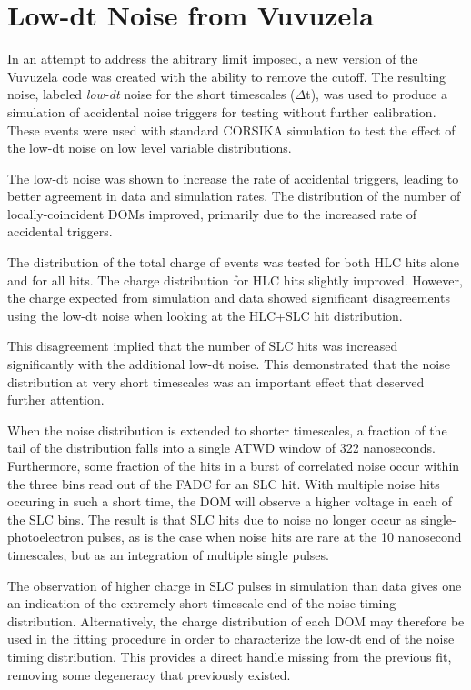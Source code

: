\label{sec:lowdt_vuvuzela}
\section{Low-dt Noise from Vuvuzela}
In an attempt to address the abitrary limit imposed, a new version of the Vuvuzela code was created with the ability to remove the cutoff.
The resulting noise, labeled \emph{low-dt} noise for the short timescales ($\Delta$t), was used to produce a simulation of accidental noise triggers for testing without further calibration.
These events were used with standard CORSIKA simulation to test the effect of the low-dt noise on low level variable distributions.

The low-dt noise was shown to increase the rate of accidental triggers, leading to better agreement in data and simulation rates.
The distribution of the number of locally-coincident DOMs improved, primarily due to the increased rate of accidental triggers.

The distribution of the total charge of events was tested for both HLC hits alone and for all hits. 
The charge distribution for HLC hits slightly improved.
However, the charge expected from simulation and data showed significant disagreements using the low-dt noise when looking at the HLC+SLC hit distribution.

This disagreement implied that the number of SLC hits was increased significantly with the additional low-dt noise. 
This demonstrated that the noise distribution at very short timescales was an important effect that deserved further attention.

When the noise distribution is extended to shorter timescales, a fraction of the tail of the distribution falls into a single ATWD window of 322 nanoseconds.
Furthermore, some fraction of the hits in a burst of correlated noise occur within the three bins read out of the FADC for an SLC hit.
With multiple noise hits occuring in such a short time, the DOM will observe a higher voltage in each of the SLC bins.
The result is that SLC hits due to noise no longer occur as single-photoelectron pulses, as is the case when noise hits are rare at the 10 nanosecond timescales, but as an integration of multiple single pulses.

The observation of higher charge in SLC pulses in simulation than data  gives one an indication of the extremely short timescale end of the noise timing distribution.
Alternatively, the charge distribution of each DOM may therefore be used in the fitting procedure in order to characterize the low-dt end of the noise timing distribution.
This provides a direct handle missing from the previous fit, removing some degeneracy that previously existed.

